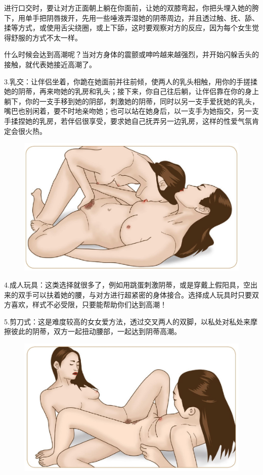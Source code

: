 \documentclass[12pt,UTF8]{ctexbook}
\begin{document}
进行口交时，要让对方正面朝上躺在你面前，让她的双膝弯起，你把头埋入她的胯下，用单手把阴唇拨开，先用一些唾液弄湿她的阴蒂周边，并且透过触、抚、舔、揉等方式，或使用舌尖绕圈，或上下舔，这时要观察对方的反应，因为每个女生觉得舒服的方式不太一样。

什么时候会达到高潮呢？当对方身体的震颤或呻吟越来越强烈，并开始闪躲舌头的接触，就代表她接近高潮了。

3.乳交：让伴侣坐着，你跪在她面前并往前倾，使两人的乳头相触，用你的手搓揉她的阴蒂，再来吻她的乳房和乳头；接下来，你自己往后躺，让伴侣靠在你的身上躺下，你的一支手移到她的阴部，刺激她的阴蒂，同时以另一支手爱抚她的乳头，嘴巴也别闲着，要不时地亲吻她；也可以站在她身后，以一支手为她指交，另一支手揉捏她的乳房，若伴侣很享受，要求她自己抚弄另一边乳房，这样的性爱气氛肯定会很火热。

\begin{figure}[H]
	\centering
	\includegraphics[width=0.7\linewidth]{11}
	\caption{}
	\label{fig:1}
\end{figure}

4.成人玩具：这类选择就很多了，例如用跳蛋刺激阴蒂，或是穿戴上假阳具，空出来的双手可以扶着她的腰，与对方进行超紧密的身体接合。选择成人玩具时只要双方喜欢，样式不必受限，只要能帮助你们达到高潮！

5.剪刀式：这是难度较高的女女爱方法，透过交叉两人的双脚，以私处对私处来摩擦彼此的阴蒂，双方一起扭动腰部，一起达到阴蒂高潮。

\begin{figure}[H]
	\centering
	\includegraphics[width=0.7\linewidth]{12}
	\caption{}
	\label{fig:1}
\end{figure}
\end{document}
